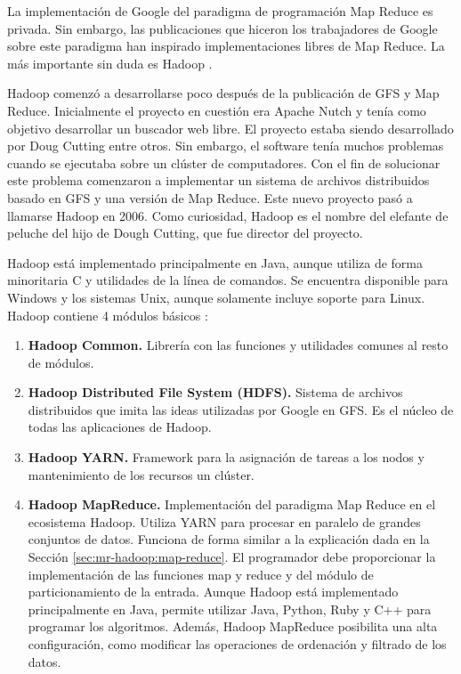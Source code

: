 \documentclass[10pt]{article}
\begin{document}
		La implementación de Google del paradigma de programación Map Reduce es privada. Sin embargo, las publicaciones que hiceron los trabajadores de Google sobre este paradigma han inspirado implementaciones libres de Map Reduce. La más importante sin duda es Hadoop \cite{hadoop-book}. 
		
		Hadoop comenzó a desarrollarse poco después de la publicación de GFS y Map Reduce. Inicialmente el proyecto en cuestión era Apache Nutch \cite{nutch} y tenía como objetivo desarrollar un buscador web libre. El proyecto estaba siendo desarrollado por Doug Cutting entre otros. Sin embargo, el software tenía muchos problemas cuando se ejecutaba sobre un clúster de computadores. Con el fin de solucionar este problema comenzaron a implementar un sistema de archivos distribuidos basado en GFS y una versión de Map Reduce. Este nuevo proyecto pasó a llamarse Hadoop en 2006. Como curiosidad, Hadoop es el nombre del elefante de peluche del hijo de Dough Cutting, que fue director del proyecto.
		
		Hadoop está implementado principalmente en Java, aunque utiliza de forma minoritaria C y utilidades de la línea de comandos. Se encuentra disponible para Windows y los sistemas Unix, aunque solamente incluye soporte para Linux. Hadoop contiene 4 módulos básicos \cite{hadoop-doc}:
		 
		\begin{enumerate}
			\item \textbf{Hadoop Common.} Librería con las funciones y utilidades comunes al resto de módulos.
			\item \textbf{Hadoop Distributed File System (HDFS).} Sistema de archivos distribuidos que imita las ideas utilizadas por Google en GFS. Es el núcleo de todas las aplicaciones de Hadoop.
			\item \textbf{Hadoop YARN.} Framework para la asignación de tareas a los nodos y mantenimiento de los recursos un clúster.
			\item \textbf{Hadoop MapReduce.} Implementación del paradigma Map Reduce en el ecosistema Hadoop. Utiliza YARN para procesar en paralelo de grandes conjuntos de datos. Funciona de forma similar a la explicación dada en la Sección \ref{sec:mr-hadoop:map-reduce}. El programador debe proporcionar la implementación de las funciones map y reduce y del módulo de particionamiento de la entrada. Aunque Hadoop está implementado principalmente en Java, permite utilizar Java, Python, Ruby y C++ para programar los algoritmos. Además, Hadoop MapReduce posibilita una alta configuración, como modificar las operaciones de ordenación y filtrado de los datos.
		\end{enumerate}
		
\end{document}
